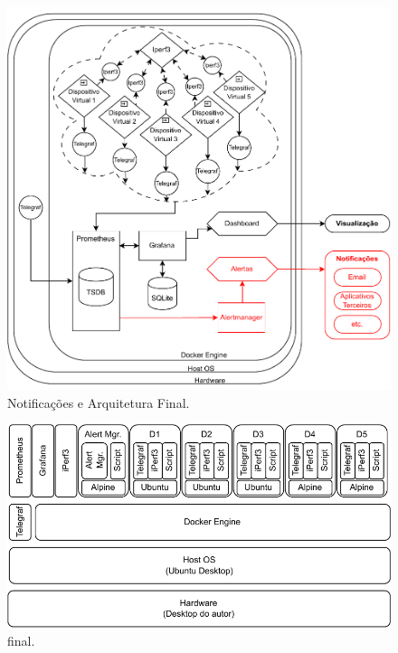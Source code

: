 \begin{figure}[H]
\centering
\setlength{\abovecaptionskip}{-20pt}
\includegraphics[width=\textwidth]{Imagens/chap03/by-blocks/alerts_diagram.pdf}
\caption{Notificações e Arquitetura Final.}
\label{fig:DiagramaAlertas}
\end{figure}


\begin{figure}[H]
\centering
\setlength{\abovecaptionskip}{-20pt}
\includegraphics[width=\textwidth]{Imagens/chap04/final_stack.pdf}
\caption{ final.}
\label{fig:StackFinal}
\end{figure}

